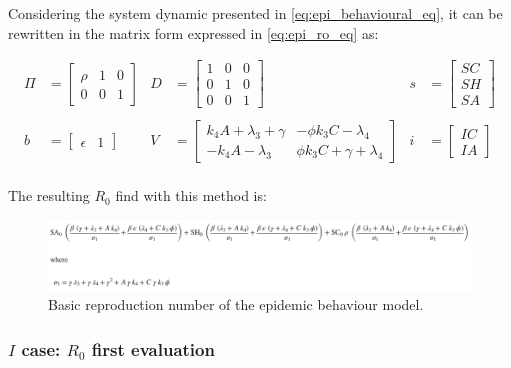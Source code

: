 Considering the system dynamic presented in \eqref{eq:epi_behavioural_eq}, it can be rewritten in the matrix form expressed in  \eqref{eq:epi_ro_eq} as: 

\begin{align*}
\Pi & = 
\begin{bmatrix}
	\rho & 1 & 0 \\
	0 & 0 & 1
\end{bmatrix} &
D & = 
\begin{bmatrix}
	1 & 0 & 0 \\
	0 & 1 & 0\\
	0 & 0 & 1
\end{bmatrix} & 
s & = 
\begin{bmatrix}
	SC \\
	SH\\
	SA 
\end{bmatrix} \\
\\
b & = \begin{bmatrix}
	\epsilon & 1
\end{bmatrix} & 
V & = 
\begin{bmatrix}
	k_4 A + \lambda_3 + \gamma & - \phi k_3  C - \lambda_4\\
	- k_4 A - \lambda_3 & \phi k_3 C + \gamma + \lambda_4
\end{bmatrix} & 
i & = 
\begin{bmatrix}
	IC \\
	IA
\end{bmatrix}
\\
\end{align*}


The resulting $R_0$ find with this method is: 
\begin{figure}
	\centering
	\includegraphics[width=0.99\linewidth]{1_corpo/figure/r0/ro_epidemic_behavioural}
	\caption[reproduction number of epidemic behaviour model.]{Basic reproduction number of the epidemic behaviour model.}
	\label{fig:roepidemicbehavioural}
\end{figure}



\subsubsection{$I$ case: $R_0$ first evaluation}

